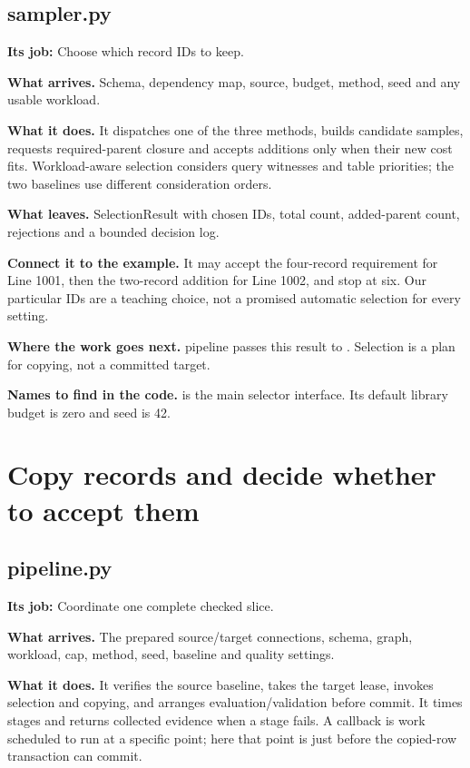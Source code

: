 
\subsection{sampler.py}

\textbf{Its job:} Choose which record IDs to keep.

\textbf{What arrives.} Schema, dependency map, source, budget, method, seed and any usable workload.

\textbf{What it does.} It dispatches one of the three methods, builds candidate samples, requests required-parent closure and accepts additions only when their new cost fits. Workload-aware selection considers query witnesses and table priorities; the two baselines use different consideration orders.

\textbf{What leaves.} SelectionResult with chosen IDs, total count, added-parent count, rejections and a bounded decision log.

\textbf{Connect it to the example.} It may accept the four-record requirement for Line 1001, then the two-record addition for Line 1002, and stop at six. Our particular IDs are a teaching choice, not a promised automatic selection for every setting.

\textbf{Where the work goes next.} pipeline passes this result to . Selection is a plan for copying, not a committed target.

\textbf{Names to find in the code.}  is the main selector interface. Its default library budget is zero and seed is 42.

\section{Copy records and decide whether to accept them}


\subsection{pipeline.py}

\textbf{Its job:} Coordinate one complete checked slice.

\textbf{What arrives.} The prepared source/target connections, schema, graph, workload, cap, method, seed, baseline and quality settings.

\textbf{What it does.} It verifies the source baseline, takes the target lease, invokes selection and copying, and arranges evaluation/validation before commit. It times stages and returns collected evidence when a stage fails. A callback is work scheduled to run at a specific point; here that point is just before the copied-row transaction can commit.

